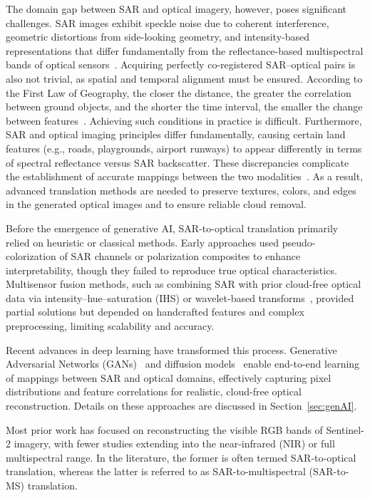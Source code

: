 The domain gap between SAR and optical imagery, however, poses significant challenges. SAR images exhibit speckle noise due to coherent interference, geometric distortions from side-looking geometry, and intensity-based representations that differ fundamentally from the reflectance-based multispectral bands of optical sensors~\cite{sar2opt_cGAN_Optim_oppr_limits}. Acquiring perfectly co-registered SAR–optical pairs is also not trivial, as spatial and temporal alignment must be ensured. According to the First Law of Geography, the closer the distance, the greater the correlation between ground objects, and the shorter the time interval, the smaller the change between features~\cite{sar_2_opt_CGAN_survey_taxonomy}. Achieving such conditions in practice is difficult. Furthermore, SAR and optical imaging principles differ fundamentally, causing certain land features (e.g., roads, playgrounds, airport runways) to appear differently in terms of spectral reflectance versus SAR backscatter. These discrepancies complicate the establishment of accurate mappings between the two modalities~\cite{sar_2_opt_CGAN_survey_taxonomy}. As a result, advanced translation methods are needed to preserve textures, colors, and edges in the generated optical images and to ensure reliable cloud removal.

Before the emergence of generative AI, SAR-to-optical translation primarily relied on heuristic or classical methods. Early approaches used pseudo-colorization of SAR channels or polarization composites to enhance interpretability, though they failed to reproduce true optical characteristics. Multisensor fusion methods, such as combining SAR with prior cloud-free optical data via intensity–hue–saturation (IHS) or wavelet-based transforms~\cite{IHS_wavelet_Zhang2019}, provided partial solutions but depended on handcrafted features and complex preprocessing, limiting scalability and accuracy.

Recent advances in deep learning have transformed this process. Generative Adversarial Networks (GANs)~\cite{GANs_Goodfellow} and diffusion models~\cite{DDPM_2020} enable end-to-end learning of mappings between SAR and optical domains, effectively capturing pixel distributions and feature correlations for realistic, cloud-free optical reconstruction. Details on these approaches are discussed in Section~\ref{sec:genAI}.

Most prior work has focused on reconstructing the visible RGB bands of Sentinel-2 imagery, with fewer studies extending into the near-infrared (NIR) or full multispectral range. In the literature, the former is often termed SAR-to-optical translation, whereas the latter is referred to as SAR-to-multispectral (SAR-to-MS) translation.

